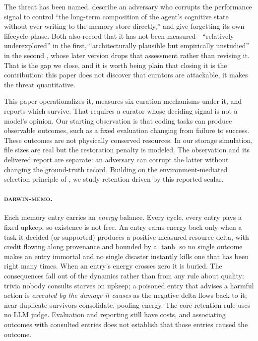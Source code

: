 The threat has been named. \citet{lin2026selfevolving} describe an
adversary who corrupts the performance signal to control ``the long-term
composition of the agent's cognitive state without ever writing to the
memory store directly,'' and \citet{lin2026memsurvey} give forgetting
its own lifecycle phase. Both also record that it has not been
measured---``relatively underexplored'' in the first, ``architecturally
plausible but empirically unstudied'' in the second
\citep{lin2026memsurveyv1}, whose later version drops that assessment
rather than revising it. That is the gap we
close, and it is worth being plain that closing it is the contribution:
this paper does not discover that curators are attackable, it makes the
threat quantitative.

This paper operationalizes it, measures six curation mechanisms under it,
and reports which survive. That requires a curator whose deciding signal
is not a model's opinion. Our starting observation is that coding tasks can produce observable
outcomes, such as a fixed evaluation changing from failure to success.
These outcomes are not physically conserved resources. In our storage
simulation, file sizes are real but the restoration penalty is modeled.
The observation and its delivered report are separate: an adversary can
corrupt the latter without changing the ground-truth record.
Building on the environment-mediated selection principle of
\citet{dodgson2026survival}, we study retention driven by this reported scalar.

\paragraph{\textsc{darwin-memo}.}
Each memory entry carries an \emph{energy} balance. Every cycle, every
entry pays a fixed upkeep, so existence is not free. An entry earns energy
back only when a task it decided (or supported) produces a positive
measured resource delta, with credit flowing along provenance and bounded
by a $\tanh$ so no single outcome makes an entry immortal and no single
disaster instantly kills one that has been right many times. When an
entry's energy crosses zero it is buried. The consequences fall out of the
dynamics rather than from any rule about quality: trivia nobody consults
starves on upkeep; a poisoned entry that advises a harmful action is
\emph{executed by the damage it causes} as the negative delta flows back
to it; near-duplicate survivors consolidate, pooling energy. The core retention rule uses no LLM judge. Evaluation and reporting still
have costs, and associating outcomes with consulted entries does not
establish that those entries caused the outcome.

